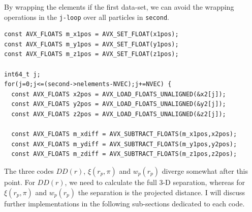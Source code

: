 \documentclass[12pt,titlepage]{article}
\newcommand{\xir}{\ensuremath{{DD(r)}}\xspace}
\newcommand{\wprp}{\ensuremath{{w_p(r_p)}}\xspace}
\newcommand{\xirppi}{\ensuremath{{\xi(r_p,\pi)}}\xspace}
\begin{document}
By wrapping the elements if the first data-set, we can avoid the wrapping operations in the \texttt{j-loop} over all particles in \texttt{second}. 
\begin{lstlisting}[label={code:looping_over_second_particles},caption={AVX intrinsics for looping over all particles in the \texttt{second} cell. PERIODIC boundary conditions have 
already been accounted for in \texttt{x1pos,y1pos,z1pos} variables.}]
const AVX_FLOATS m_x1pos = AVX_SET_FLOAT(x1pos);
const AVX_FLOATS m_y1pos = AVX_SET_FLOAT(y1pos);
const AVX_FLOATS m_z1pos = AVX_SET_FLOAT(z1pos);

int64_t j;
for(j=0;j<=(second->nelements-NVEC);j+=NVEC) {
  const AVX_FLOATS x2pos = AVX_LOAD_FLOATS_UNALIGNED(&x2[j]);
  const AVX_FLOATS y2pos = AVX_LOAD_FLOATS_UNALIGNED(&y2[j]);
  const AVX_FLOATS z2pos = AVX_LOAD_FLOATS_UNALIGNED(&z2[j]);
  
  const AVX_FLOATS m_xdiff = AVX_SUBTRACT_FLOATS(m_x1pos,x2pos);
  const AVX_FLOATS m_ydiff = AVX_SUBTRACT_FLOATS(m_y1pos,y2pos);
  const AVX_FLOATS m_zdiff = AVX_SUBTRACT_FLOATS(m_z1pos,z2pos);
\end{lstlisting}  

The three codes \xir, \xirppi and \wprp diverge somewhat after this point. For \xir, we need to calculate the full 3-D separation, whereas for \xirppi and \wprp 
the separation is the projected distance. I will discuss further implementations in the following sub-sections dedicated to each code. 
\end{document}
